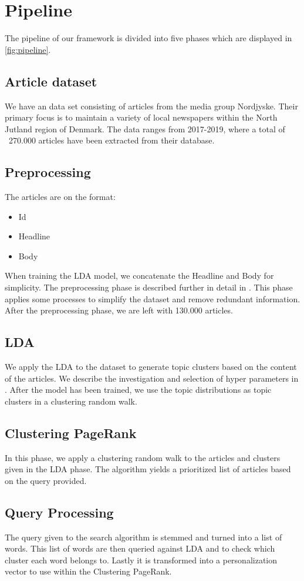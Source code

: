 \section{Pipeline}


The pipeline of our framework is divided into five phases which are displayed in \autoref{fig:pipeline}.

\subsection{Article dataset}
We have an data set consisting of articles from the media group Nordjyske. Their primary focus is to maintain a variety of local newspapers within the North Jutland region of Denmark. 
The data ranges from 2017-2019, where a total of ~270.000 articles have been extracted from their database.

\subsection{Preprocessing}
The articles are on the format:
\begin{itemize}
	\item Id
	\item Headline
	\item Body
\end{itemize}
When training the LDA model, we concatenate the Headline and Body for simplicity.
The preprocessing phase is described further in detail in .
This phase applies some processes to simplify the dataset and remove redundant information. 
After the preprocessing phase, we are left with 130.000 articles.

\subsection{LDA}
We apply the \acrfull{LDA} to the dataset to generate topic clusters based on the content of the articles. 
We describe the investigation and selection of hyper parameters in . 
After the model has been trained, we use the topic distributions as topic clusters in a clustering random walk.

\subsection{Clustering PageRank}
In this phase, we apply a clustering random walk to the articles and clusters given in the \gls{LDA} phase.
The algorithm yields a prioritized list of articles based on the query provided.


\subsection{Query Processing}
The query given to the search algorithm is stemmed and turned into a list of words. 
This list of words are then queried against LDA and to check which cluster each word belongs to.
Lastly it is transformed into a personalization vector to use within the Clustering PageRank.


